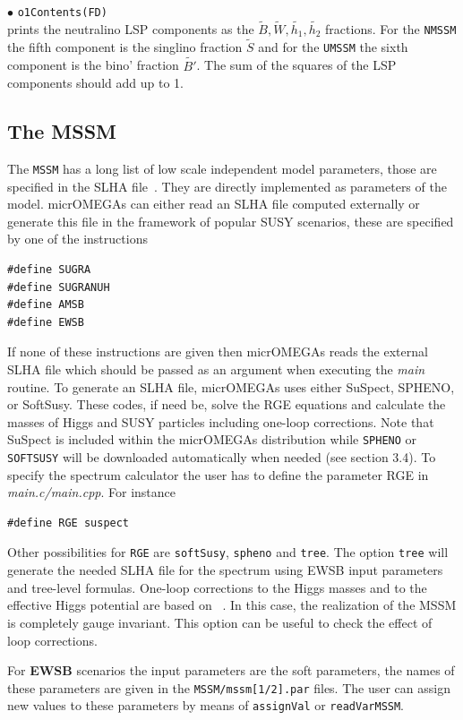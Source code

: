 \documentclass[12pt,a4paper]{article}
\begin{document}
\noindent
$\bullet$  \verb|o1Contents(FD)|\\
prints  the neutralino LSP components as the  $\tilde{B},\tilde{W},
\tilde{h_1},\tilde{h_2}$ fractions. For the {\tt NMSSM} the fifth component is
the singlino fraction  $\tilde{S}$ and for the {\tt UMSSM} the sixth component is
the bino' fraction  $\tilde{B'}$. The sum of the squares of the LSP components
should add up to 1. 



\subsection{The MSSM}
The {\tt MSSM} has a long list of low scale  independent model 
parameters, those are specified in the SLHA file~\cite{Skands:2003cj,Allanach:2008qq}.
They are directly implemented as parameters of the model.
micrOMEGAs can either read an SLHA file computed externally or
generate  this file in the  framework of  popular  SUSY scenarios, these are specified by one of the instructions
\begin{verbatim}
#define SUGRA
#define SUGRANUH
#define AMSB 
#define EWSB
\end{verbatim}  
If none of these instructions are given then micrOMEGAs reads the external SLHA file which should be passed as an argument  when executing the {\it main} routine. 
To generate  an SLHA file,  micrOMEGAs uses either SuSpect, SPHENO, or SoftSusy. These codes, if need be, solve the RGE equations and calculate the masses of Higgs and SUSY particles including one-loop corrections.  Note that SuSpect  is included within the micrOMEGAs distribution while  {\tt SPHENO} or {\tt SOFTSUSY} will be downloaded automatically when needed (see section 3.4).
To specify  the spectrum calculator  the user has to define the parameter RGE  in {\it main.c/main.cpp}. For instance
\begin{verbatim}
#define RGE suspect
\end{verbatim}  
Other possibilities for \verb|RGE| are  \verb|softSusy|, \verb|spheno| and \verb|tree|. The option \verb|tree| will generate the needed SLHA file for the spectrum  using  EWSB input parameters and tree-level formulas. One-loop corrections to the Higgs masses and to the effective Higgs potential are based on ~\cite{Carena:1995wu}. In this case, the realization of the MSSM is  completely gauge invariant. This option can be useful to check the 
effect of loop corrections.    


For {\bf EWSB} scenarios the input parameters are  the soft parameters, the names 
of these parameters are given in the {\tt MSSM/mssm[1/2].par} files.
The user  can assign new values to these parameters by means of {\tt assignVal}
or {\tt readVarMSSM}.  
\end{document}

